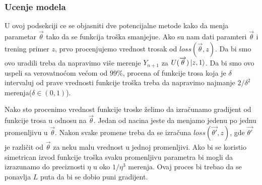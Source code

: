 \documentclass[12pt, letterpaper, oneside]{article}
\begin{document}
\subsubsection{Ucenje modela}
U ovoj podsekciji ce se objasniti dve potencijalne metode kako da menja parametar $\overrightarrow{\theta}$ tako da se funkcija troška smanjejue.
Ako su nam dati paramteri $\overrightarrow{\theta}$ i trening primer $z$, prvo procenjujemo vrednost trosak od $\mathit{loss}(\overrightarrow{\theta},z)$.
Da bi smo ovo uradili treba da napravimo više merenje $Y_{n+1}$ za $U(\overrightarrow{\theta})\Ket{z,1}$.
Da bi smo ovo uspeli sa verovatnoćom većom od $99\%$, procena of funkcije trosa koja je $\delta$ intervaluj od prave vrednosti funkcije troška
treba da napravimo najmanje $2/\delta^2$ merenja($\delta \in (0,1)$).

Nako sto procenimo vrednost funkcije troske želimo da izračunamo gradijent od funkcije trosa u odnosu na $\overrightarrow{\theta}$.
Jedan od nacina jeste da menjamo jedenu po jednu promenljivu u $\overrightarrow{\theta}$. Nakon svake promene treba da se izračuna
$\mathit{loss}(\overrightarrow{\theta'},z)$, gde $\overrightarrow{\theta'}$ je različit od $\overrightarrow{\theta}$ za neku malu vrednost u jednoj promenljivi.
Ako bi se koristio simetrican izvod funkcije troška svaku promenljivu parametra bi mogli da izrazunamo do preciznosti $\eta$ u oko $1/\eta^3$ merenja.
Ovaj proces bi trebao da se ponavlja $L$ puta da bi se dobio puni gradijent.
\end{document}
